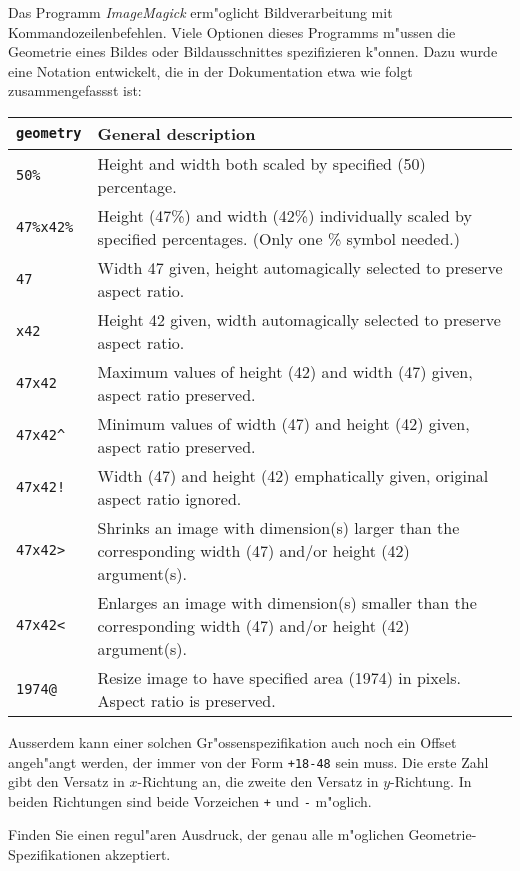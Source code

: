 Das Programm {\em ImageMagick} erm"oglicht Bildverarbeitung mit
Kommandozeilenbefehlen. Viele Optionen dieses Programms m"ussen die
Geometrie eines Bildes oder Bildausschnittes spezifizieren k"onnen.
Dazu wurde eine Notation entwickelt, die in der Dokumentation etwa
wie folgt zusammengefassst ist:
\begin{center}
\begin{tabular}{>{\tt}lp{5.75in}}
\rm geometry&General description\\
\hline
50\%&Height and width both scaled by specified (50) percentage.\\
47\%x42\%&Height (47\%) and width (42\%) individually scaled by specified
percentages. (Only one \% symbol needed.)\\
47&Width 47 given, height automagically selected to preserve aspect ratio.\\
x42&Height 42 given, width automagically selected to preserve aspect ratio.\\
47x42&Maximum values of height (42) and width (47) given, aspect ratio
preserved.\\
47x42\^&Minimum values of width (47) and height (42) given, aspect ratio
preserved.\\
47x42!&Width (47) and height (42) emphatically given, original
aspect ratio ignored.\\
47x42>&Shrinks an image with dimension(s) larger than the
corresponding width (47) and/or height (42) argument(s).\\
47x42<&Enlarges an image with dimension(s) smaller than the
corresponding width (47) and/or height (42) argument(s).\\
1974@&Resize image to have specified area (1974) in pixels. Aspect ratio is
preserved.\\
\hline
\end{tabular}
\end{center}
Ausserdem kann einer solchen Gr"ossenspezifikation auch noch ein Offset
angeh"angt werden, der immer von der Form
\texttt{+18-48}
sein muss. Die erste Zahl gibt den Versatz in $x$-Richtung an, die zweite
den Versatz in $y$-Richtung. In beiden Richtungen sind beide Vorzeichen 
\texttt{+} und \texttt{-} m"oglich.

Finden Sie einen regul"aren Ausdruck, der genau alle m"oglichen
Geometrie-Spezifikationen akzeptiert.

